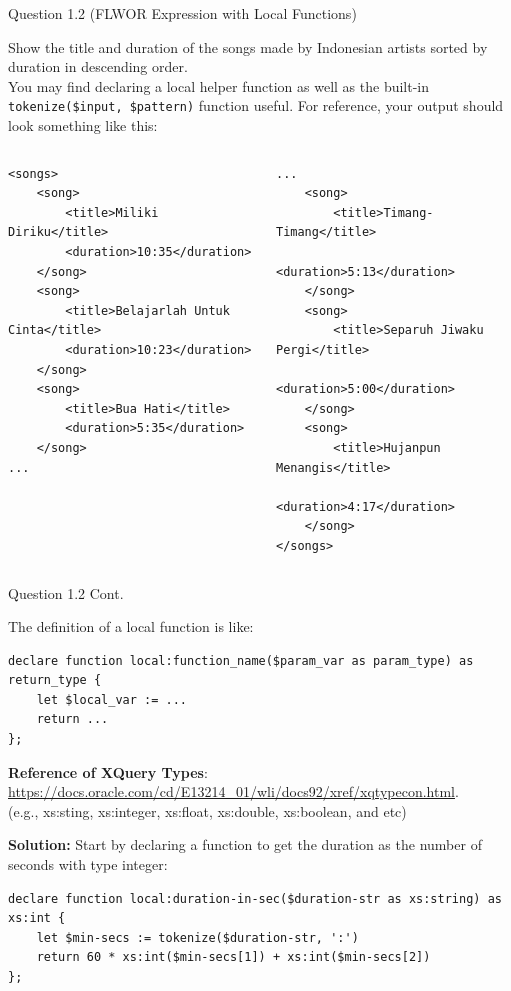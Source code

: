 \begin{frame}[fragile]{Question 1.2 (FLWOR Expression with Local Functions)}
	
Show the title and duration of the songs made by Indonesian artists sorted by duration in descending order. \\\vspace{5pt}
You may find declaring a local helper function as well as the built-in \texttt{tokenize(\$input, \$pattern)} function useful. For reference, your output should look something like this:\\\vspace{5pt}
\begin{columns}
\begin{lstlisting}[style=xml-small-nomargin]
<songs>
	<song>
		<title>Miliki Diriku</title>
		<duration>10:35</duration>
	</song>
	<song>
		<title>Belajarlah Untuk Cinta</title>
		<duration>10:23</duration>
	</song>
	<song>
		<title>Bua Hati</title>
		<duration>5:35</duration>
	</song>
...
\end{lstlisting}
\begin{lstlisting}[style=xml-small-nomargin]
...	
	<song>
		<title>Timang-Timang</title>
		<duration>5:13</duration>
	</song>
	<song>
		<title>Separuh Jiwaku Pergi</title>
		<duration>5:00</duration>
	</song>
	<song>
		<title>Hujanpun Menangis</title>
		<duration>4:17</duration>
	</song>
</songs>
\end{lstlisting}
\end{columns}
\end{frame}

\begin{frame}[fragile]{Question 1.2 Cont.}

The definition of a local function is like:	
\begin{lstlisting}[style=xml-small-nomargin]
declare function local:function_name($param_var as param_type) as return_type {
	let $local_var := ...
	return ...
};
\end{lstlisting}

\textbf{Reference of XQuery Types}: \url{https://docs.oracle.com/cd/E13214_01/wli/docs92/xref/xqtypecon.html}.\\
(e.g., xs:sting, xs:integer, xs:float, xs:double, xs:boolean, and etc)\vspace{10pt}

\textbf{Solution:} Start by declaring a function to get the duration as the number of seconds with type integer:\\\vspace{5pt}
\begin{lstlisting}[style=xml-small]
declare function local:duration-in-sec($duration-str as xs:string) as xs:int {
	let $min-secs := tokenize($duration-str, ':')
	return 60 * xs:int($min-secs[1]) + xs:int($min-secs[2])
};
\end{lstlisting}

\end{frame}

